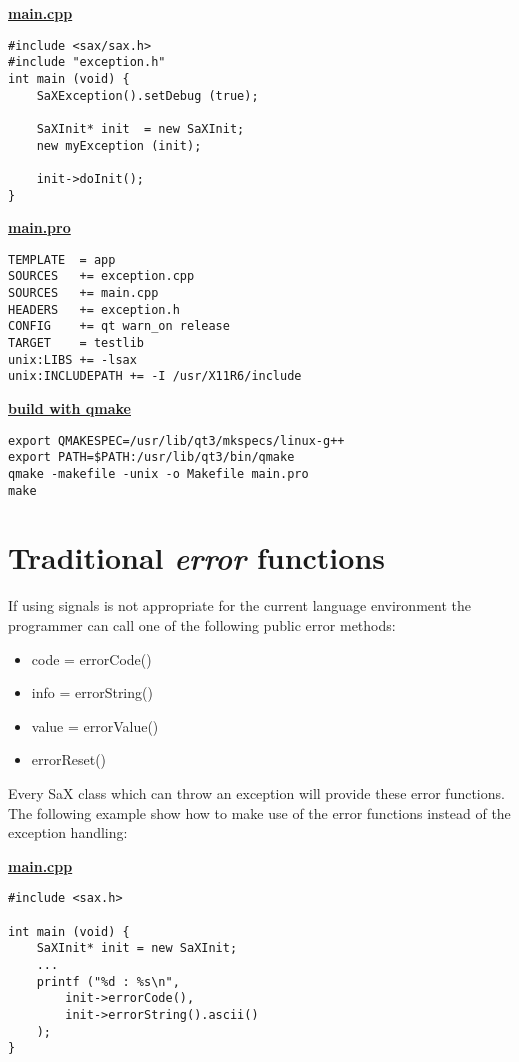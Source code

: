 \textbf{\underline{main.cpp}}

\begin{Command}{12cm}
\begin{small}
\begin{verbatim}
#include <sax/sax.h>
#include "exception.h"
int main (void) {
    SaXException().setDebug (true);

    SaXInit* init  = new SaXInit;
    new myException (init);

    init->doInit();
}
\end{verbatim}
\end{small}
\end{Command}

\textbf{\underline{main.pro}}

\begin{Command}{12cm}
\begin{small}
\begin{verbatim}
TEMPLATE  = app
SOURCES   += exception.cpp
SOURCES   += main.cpp
HEADERS   += exception.h
CONFIG    += qt warn_on release
TARGET    = testlib
unix:LIBS += -lsax
unix:INCLUDEPATH += -I /usr/X11R6/include
\end{verbatim}
\end{small}
\end{Command}

\textbf{\underline{build with qmake}}

\begin{Command}{12cm}
\begin{small}
\begin{verbatim}
export QMAKESPEC=/usr/lib/qt3/mkspecs/linux-g++
export PATH=$PATH:/usr/lib/qt3/bin/qmake
qmake -makefile -unix -o Makefile main.pro
make
\end{verbatim}
\end{small}
\end{Command}

\newpage

\section{Traditional \textit{error} functions}
If using signals is not appropriate for the current language environment
the programmer can call one of the following public error methods:
\begin{itemize}
\item code = errorCode()
\item info = errorString()
\item value = errorValue()
\item errorReset()
\end{itemize}
Every SaX class which can throw an exception will provide these
error functions. The following example show how to make use of the error
functions instead of the exception handling:

\textbf{\underline{main.cpp}}

\begin{Command}{12cm}
\begin{small}
\begin{verbatim}
#include <sax.h>

int main (void) {
    SaXInit* init = new SaXInit;
    ...
    printf ("%d : %s\n",
        init->errorCode(),
        init->errorString().ascii()
    );
}
\end{verbatim}
\end{small}
\end{Command}
